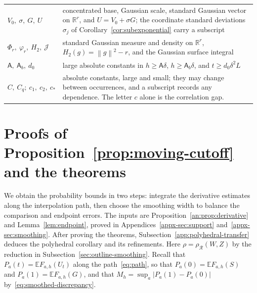 \documentclass[11pt,letterpaper]{article}
\theoremstyle{remark}
\newcommand{\E}{\mathbb E}
\newcommand{\R}{\mathbb R}
\newcommand{\norm}[1]{\left\lVert#1\right\rVert}
\newcommand{\rh}{\rho_{\mathcal R}}
\newcommand{\surf}{\mathcal J}
\begin{document}
\begin{longtable}{@{}p{}p{}@{}}
\(V_0,\ \sigma,\ G,\ U\) & concentrated base, Gaussian scale, standard
Gaussian vector on \(\R^r\), and \(U=V_0+\sigma G\); the coordinate
standard deviations \(\sigma_j\) of Corollary~\ref{cor:subexponential}
carry a subscript\\
\(\Phi_r,\ \varphi_r,\ H_2,\ \surf\) & standard Gaussian measure and
density on \(\R^r\), \(H_2(g)=\norm g^2-r\), and the Gaussian surface
integral\\
\(\mathsf A,\ \mathsf A_b,\ d_0\) & large absolute constants in
\(h\ge\mathsf A\delta\), \(h\ge\mathsf A_b\delta\), and
\(t\ge d_0\delta^2L\)\\
\(C,\ C_q;\ c_1,\ c_2,\ c_*\) & absolute constants, large and small;
they may change between occurrences, and a subscript records any
dependence. The letter \(c\) alone is the correlation gap.\\
\end{longtable}
\endgroup

\section{\texorpdfstring{Proofs of Proposition~\ref{prop:moving-cutoff} and the theorems}{Proofs of Proposition 2 and the theorems}}\label{sec:main-proof}
We obtain the probability bounds in two steps: integrate the derivative
estimates along the interpolation path, then choose the smoothing width
to balance the comparison and endpoint errors. The inputs are
Proposition~\ref{an:prop:derivative} and Lemma~\ref{lem:endpoint}, proved in
Appendices~\ref{appx-sec:support} and~\ref{appx-sec:smoothing}.
After proving the theorems, Subsection~\ref{app:polyhedral-transfer}
deduces the polyhedral corollary and its refinements.
Here \(\rho=\rh(W,Z)\) by the reduction in
Subsection~\ref{sec:outline-smoothing}. Recall that \(P_a(t)=\E F_{a,h}(U_t)\) along the
path~\eqref{eq:path}, so that \(P_a(0)=\E F_{a,h}(S)\) and
\(P_a(1)=\E F_{a,h}(G)\), and that
\(M_h=\sup_a|P_a(1)-P_a(0)|\) by~\eqref{eq:smoothed-discrepancy}.
\end{document}
